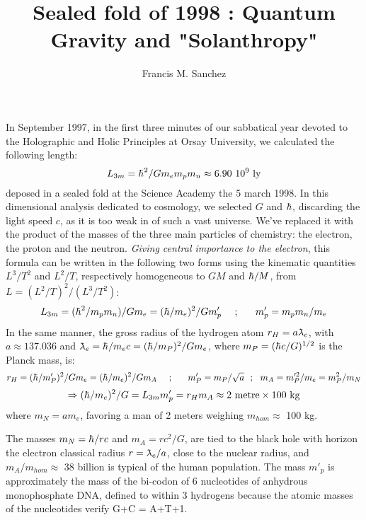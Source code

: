 \documentclass[a4paper,12pt]{article}
\title{Sealed fold of 1998 : Quantum Gravity and "Solanthropy"}
\author[1]{Francis M. Sanchez}
\renewcommand{\hbar}{{\mkern0.75mu\mathchar '26\mkern -9.75mu h}}
\newcommand{\lambdabar}{{\mkern0.75mu\mathchar '26\mkern -9.75mu\lambda}}
\begin{document}
\maketitle

In September 1997, in the first three minutes of our sabbatical year devoted to the Holographic and Holic Principles at Orsay University, we calculated the following length:
\begin{equation}
    L_{3m} = \hbar^2/Gm_em_pm_n \approx 6.90 ~10^9~ \rm{ly}
\end{equation}
deposed in a sealed fold at the Science Academy the 5 march 1998. In this dimensional analysis dedicated to cosmology, we selected $G$ and $\hbar$, discarding the light speed $c$, as it is too weak in of such a vast universe. We've replaced it with the product of the masses of the three main particles of chemistry: the electron, the proton and the neutron. \textit{Giving central importance to the electron}, this formula can be written in the following two forms using the kinematic quantities $L^3/T^2$ and $L^2/T$, respectively homogeneous to $GM$ and $\hbar/M$, from $L = (L^2/T)^2/(L^3/T^2)$:
\begin{equation}
    L_{3m} = (\hbar^2/m_pm_n)/{Gm_e} = (\hbar/m_e)^2/Gm'_p ~~~~;~~~~~m'_p = m_pm_n/m_e
\end{equation}
In the same manner, the gross radius of the hydrogen atom $r_H = a \lambdabar_e$, with $a\approx 137. 036$ and $\lambdabar_e = \hbar/m_e c = (\hbar/m_P)^2/Gm_e$, where $m_P = (\hbar c /G)^{1/2}$ is the Planck mass, is:
\begin{equation}
    r_H = (\hbar/m'_P)^2/Gm_e = (\hbar/m_e)^2/Gm_A ~~~~;~~~~~m'_P = m_P/\sqrt{a} ~~;~~m_A = m_P'^2/m_e = m_P^2/m_N
\end{equation}
\begin{equation}
    \Rightarrow (\hbar/m_e)^2/G = L_{3m} m'_p = r_H m_A \approx 2~ \rm{metre} \times 100~ \rm{kg} 
\end{equation}
where $m_N = a m_e$, favoring a man of 2 meters weighing $m_{hom}\approx$ 100 kg. 

The masses $m_N = \hbar/rc$ and $m_A = rc^2/G$, are tied to the black hole with horizon the electron classical radius $r = \lambdabar_e/a$, close to the nuclear radius, and $m_A/m_{hom}\approx$ 38 billion is typical of the human population. The mass $m'_p$ is approximately the mass of the bi-codon of 6 nucleotides of anhydrous monophosphate DNA, defined to within 3 hydrogens because the atomic masses of the nucleotides verify G+C = A+T+1. 
\end{document}
